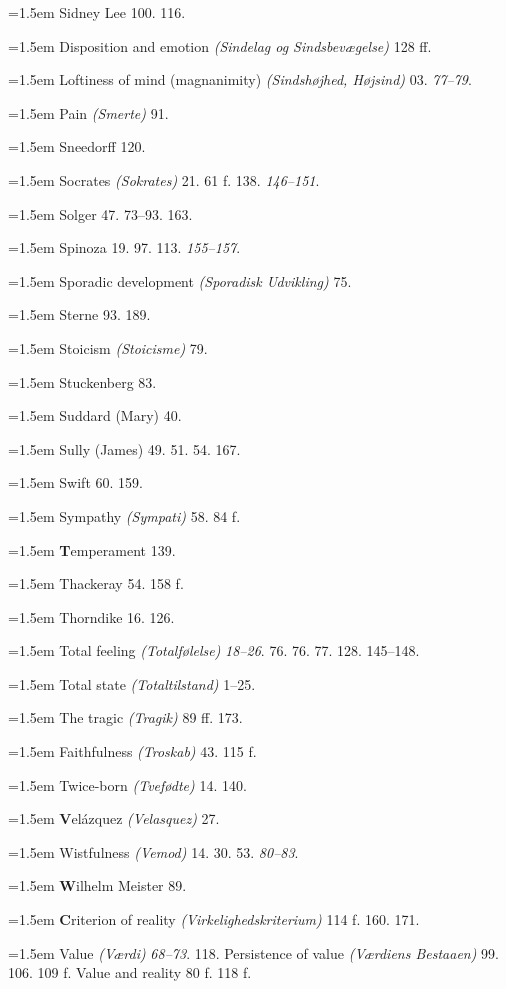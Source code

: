 \documentclass[12pt]{book}
\newcommand{\entry}{\par\noindent\hangindent=1.5em }
\begin{document}
\entry Sidney Lee 100. 116.
\entry Disposition and emotion \textit{(Sindelag og Sindsbevægelse)} 128 ff.
\entry Loftiness of mind (magnanimity) \textit{(Sindshøjhed, Højsind)} 03. \textit{77--79}. %
\entry Pain \textit{(Smerte)} 91.
\entry Sneedorff 120.
\entry Socrates \textit{(Sokrates)} 21. 61 f. 138. \textit{146--151}.
\entry Solger 47. 73--93. 163.
\entry Spinoza 19. 97. 113. \textit{155--157}.
\entry Sporadic development \textit{(Sporadisk Udvikling)} 75.
\entry Sterne 93. 189. %
\entry Stoicism \textit{(Stoicisme)} 79.
\entry Stuckenberg 83.
\entry Suddard (Mary) 40.
\entry Sully (James) 49. 51. 54. 167.
\entry Swift 60. 159.
\entry Sympathy \textit{(Sympati)} 58. 84 f.
\par\smallskip
\entry \textbf{T}emperament 139.
\entry Thackeray 54. 158 f.
\entry Thorndike 16. 126.
\entry Total feeling \textit{(Totalfølelse)} \textit{18--26}. 76. 76. 77. 128. 145--148.
\entry Total state \textit{(Totaltilstand)} 1--25.
\entry The tragic \textit{(Tragik)} 89 ff. 173.
\entry Faithfulness \textit{(Troskab)} 43. 115 f.
\entry Twice-born \textit{(Tvefødte)} 14. 140.
\par\smallskip
\entry \textbf{V}elázquez \textit{(Velasquez)} 27.
\entry Wistfulness \textit{(Vemod)} 14. 30. 53. \textit{80--83}.
\par\smallskip
\entry \textbf{W}ilhelm Meister 89.
\par\smallskip
\entry \textbf{C}riterion of reality \textit{(Virkelighedskriterium)} 114 f. 160. 171.
\entry Value \textit{(Værdi)} \textit{68--73}. 118. Persistence of value \textit{(Værdiens Bestaaen)} 99. 106.
109 f. Value and reality 80 f. 118 f.
\end{document}
